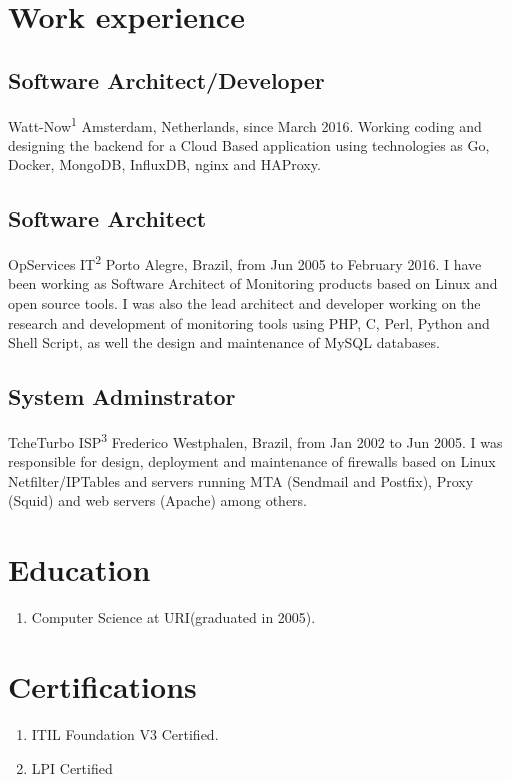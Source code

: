 \documentclass{article}
\begin{document}
\begin{multicols}{2}
\section{Work experience}
\subsection{Software Architect/Developer}
Watt-Now\textsuperscript{1} Amsterdam, Netherlands, since March 2016. Working coding
and designing the backend for a Cloud Based application using technologies as Go, Docker,
MongoDB, InfluxDB, nginx and HAProxy.

\subsection{Software Architect}
OpServices IT\textsuperscript{2} Porto Alegre, Brazil, from Jun 2005 to February 
2016. I have been working as Software Architect of Monitoring products based on Linux
and open source tools. I was also the lead architect and developer working on the 
research and development of monitoring tools using PHP, C, Perl, Python and Shell 
Script, as well the design and maintenance of MySQL databases.

\subsection{System Adminstrator}
TcheTurbo ISP\textsuperscript{3} Frederico Westphalen, Brazil, from Jan 2002 to Jun 2005.
I was responsible for design, deployment and maintenance of firewalls based on
Linux Netfilter/IPTables and servers running MTA (Sendmail and Postfix), Proxy
(Squid) and web servers (Apache) among others.

\section{Education}
\begin{enumerate}
\item Computer Science at URI(graduated in 2005).
\end{enumerate}

\section{Certifications}
\begin{enumerate}
\item ITIL Foundation V3 Certified.
\item LPI Certified
\end{enumerate}


\end{multicols}
\end{document}
